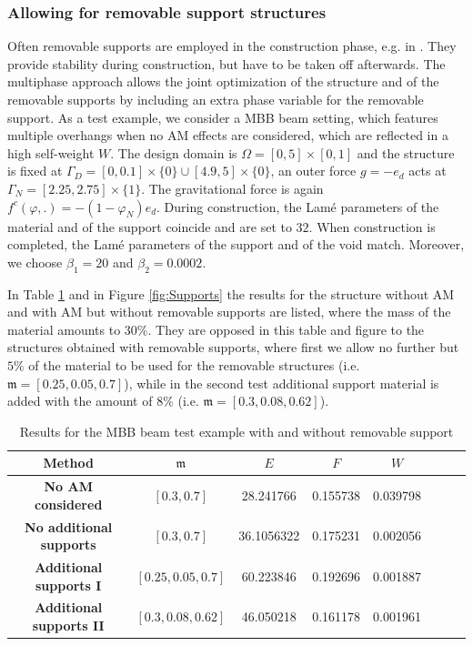 \documentclass[a4paper,11pt]{article}
\theoremstyle{remark}
\begin{document}
\subsubsection{Allowing for removable support structures}
Often removable supports are employed in the construction phase, e.g. in \cite{AllaireBogoselSupports2}.
They provide stability during construction, but have to be taken off afterwards.
The multiphase approach allows the joint optimization of the structure and of the removable supports by including an extra phase variable for the removable support. 
As a test example, we consider a MBB beam setting, which features multiple
overhangs
when no AM effects are considered, which are reflected in a high self-weight $W$.
The design domain is $\Omega=[0,5]\times [0,1]$ and the structure is fixed at $\Gamma_D=[0,0.1]\times\{0\}
 \cup[4.9,5]\times\{0\}$,
an outer force $g=-e_d$ acts at
$\Gamma_N=[2.25,2.75]\times\{1\}$.
The gravitational force is again $f^c(\varphi,.) = -(1-\varphi_N) e_d$.
During construction, the Lamé parameters of the material and of the support coincide and are set to $32$.
When construction is completed, the Lamé parameters of the support and of the void match.
Moreover, we choose $\beta_1=20$ and $\beta_2=0.0002$.

In Table \ref{tab:SupportResults} and in Figure \ref{fig:Supports} the results for the structure without AM and with AM but without removable supports are listed, where the mass of the material amounts to $30\% $.
They are opposed in this table and figure to the structures obtained with removable supports, where first we allow no further but $5\% $ of the material to be used for the removable structures (i.e. $\mathfrak{m} = [0.25, 0.05, 0.7]$),
while in the second test additional support material is added with the amount of $8\% $ (i.e. $\mathfrak{m} = [0.3, 0.08, 0.62]$).

\begin{table}[th!]
\centering
\begin{tabular}{|c|c|c|c|c|c|c|c|}
\hline
\textbf{Method} & $\mathfrak{m}$ & $E$ & $F$ & $W$ \\
\hline
\hline
\textbf{No AM considered} & $[0.3,0.7]$ & 28.241766 & 0.155738 & 0.039798 \\
\hline
\textbf{No additional supports} & $[0.3,0.7]$ & 36.1056322 & 0.175231 & 0.002056 \\
\hline 
\textbf{Additional supports I} & $[0.25, 0.05 ,0.7]$ & 60.223846 & 0.192696 & 0.001887 \\
\hline
\textbf{Additional supports II} & $[0.3,0.08, 0.62]$ & 46.050218 & 0.161178 & 0.001961 \\
\hline
\end{tabular}
\caption{Results for the MBB beam test example with and without removable support}	
\label{tab:SupportResults}
\end{table}
\end{document}
